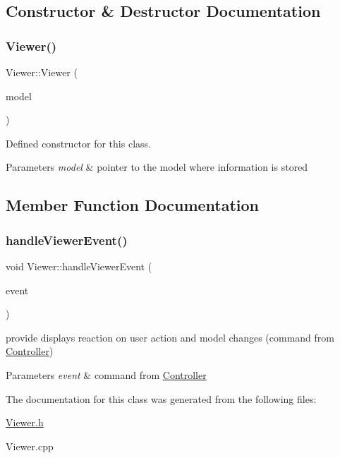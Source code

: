 \subsection{Constructor \& Destructor Documentation}
\mbox{\label{class_viewer_a767681a73f280357e6401f469c17ca4a}} 
\subsubsection{\texorpdfstring{Viewer()}{Viewer()}}
{\footnotesize\ttfamily Viewer\+::\+Viewer (\begin{DoxyParamCaption}\item[{\hyperlink{class_model}{Model} $\ast$}]{model }\end{DoxyParamCaption})}



Defined constructor for this class. 


\begin{DoxyParams}{Parameters}
{\em model} & pointer to the model where information is stored \\
\hline
\end{DoxyParams}


\subsection{Member Function Documentation}
\mbox{\label{class_viewer_a84b2479e91627860dc69e0c24d453324}} 
\subsubsection{\texorpdfstring{handle\+Viewer\+Event()}{handleViewerEvent()}}
{\footnotesize\ttfamily void Viewer\+::handle\+Viewer\+Event (\begin{DoxyParamCaption}\item[{\hyperlink{_events_8h_a7e30376069ab6f940d101ae67eb3fb34}{View\+Events}}]{event }\end{DoxyParamCaption})}



provide displays reaction on user action and model changes (command from \hyperlink{class_controller}{Controller}) 


\begin{DoxyParams}{Parameters}
{\em event} & command from \hyperlink{class_controller}{Controller} \\
\hline
\end{DoxyParams}


The documentation for this class was generated from the following files\+:\begin{DoxyCompactItemize}
\item 
\hyperlink{_viewer_8h}{Viewer.\+h}\item 
Viewer.\+cpp\end{DoxyCompactItemize}
